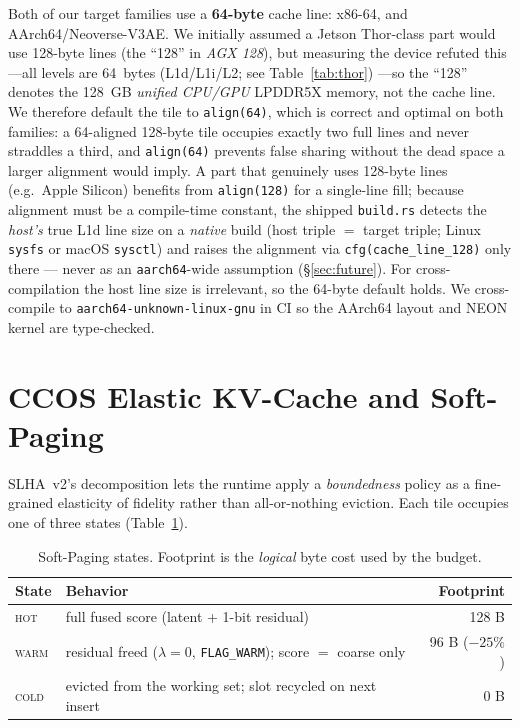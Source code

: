 \documentclass[11pt]{article}
\theoremstyle{plain}
\theoremstyle{definition}
\begin{document}
Both of our target families use a \textbf{64-byte} cache line: x86-64, and
AArch64/Neoverse-V3AE. We initially assumed a Jetson Thor-class part would
use 128-byte lines (the ``128'' in \emph{AGX 128}), but measuring the device
refuted this---all levels are 64~bytes (L1d/L1i/L2; see Table~\ref{tab:thor})
---so the ``128'' denotes the 128~GB \emph{unified CPU/GPU} LPDDR5X memory,
not the cache line.
We therefore default the tile to \texttt{align(64)}, which is correct and
optimal on both families: a 64-aligned 128-byte tile occupies exactly two full
lines and never straddles a third, and \texttt{align(64)} prevents false
sharing without the dead space a larger alignment would imply. A part that
genuinely uses 128-byte lines (e.g.\ Apple Silicon) benefits from
\texttt{align(128)} for a single-line fill; because alignment must be a
compile-time constant, the shipped \texttt{build.rs} detects the \emph{host's}
true L1d line size on a \emph{native} build (host triple $=$ target triple;
Linux \texttt{sysfs} or macOS \texttt{sysctl}) and raises the alignment via
\texttt{cfg(cache\_line\_128)} only there --- never as an \texttt{aarch64}-wide
assumption (\S\ref{sec:future}). For cross-compilation the host line size is
irrelevant, so the 64-byte default holds. We cross-compile to
\texttt{aarch64-unknown-linux-gnu} in CI so the AArch64 layout and NEON kernel
are type-checked.

\section{CCOS Elastic KV-Cache and Soft-Paging}
\label{sec:ccos}

SLHA~v2's decomposition lets the runtime apply a \emph{boundedness}
policy as a fine-grained elasticity of fidelity rather than all-or-nothing
eviction. Each tile occupies one of three states
(Table~\ref{tab:states}).

\begin{table}[t]
\centering
\caption{Soft-Paging states. Footprint is the \emph{logical} byte cost
used by the budget.}
\label{tab:states}
\small
\begin{tabular}{@{}llr@{}}
\toprule
State & Behavior & Footprint \\
\midrule
\textsc{hot}  & full fused score (latent + 1-bit residual) & 128 B \\
\textsc{warm} & residual freed ($\lambda=0$, \texttt{FLAG\_WARM}); score $=$ coarse only & 96 B ($-25\%$) \\
\textsc{cold} & evicted from the working set; slot recycled on next insert & 0 B \\
\bottomrule
\end{tabular}
\end{table}
\end{document}

